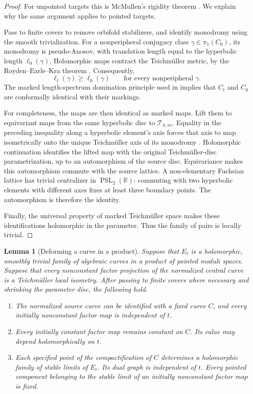 \documentclass[11pt]{article}
\newcommand{\T}{\mathcal T}
\newtheorem{lemma}[theorem]{Lemma}
\theoremstyle{remark}
\begin{document}
\begin{proof}
For unpointed targets this is McMullen's rigidity theorem
\cite[Theorem~1]{McM}. We explain why the same argument applies
to pointed targets.

Pass to finite covers to remove orbifold stabilizers, and
identify monodromy using the smooth trivialization. For a
nonperipheral conjugacy class \(\gamma\in\pi_1(C_0)\), its
monodromy is pseudo-Anosov, with translation length equal to
the hyperbolic length \(\ell_0(\gamma)\). Holomorphic maps
contract the Teichm\"uller metric, by the
Royden--Earle--Kra theorem \cite{Royden,EK}. Consequently,
\[
\ell_t(\gamma)\geq \ell_0(\gamma)
\qquad\text{for every nonperipheral }\gamma.
\]
The marked length-spectrum domination principle used in
\cite[proof of Theorem~1, fact~(1)]{McM} implies that \(C_t\)
and \(C_0\) are conformally identical with their markings.

For completeness, the maps are then identical as marked maps.
Lift them to equivariant maps from the same hyperbolic disc to
\(\T_{h,m}\). Equality in the preceding inequality along a
hyperbolic element's axis forces that axis to map isometrically
onto the unique Teichm\"uller axis of its monodromy
\cite{Bers}. Holomorphic continuation identifies the lifted map
with the original Teichm\"uller-disc parametrization, up to an
automorphism of the source disc. Equivariance makes this
automorphism commute with the source lattice. A non-elementary
Fuchsian lattice has trivial centralizer in
\(\operatorname{PSL}_2(\mathbb R)\): commuting with two
hyperbolic elements with different axes fixes at least three
boundary points. The automorphism is therefore the identity.

Finally, the universal property of marked Teichm\"uller space
makes these identifications holomorphic in the parameter.
Thus the family of pairs is locally trivial.
\end{proof}


\begin{lemma}[Deforming a curve in a product]\label{lem:curve}
Suppose that \(E_t\) is a holomorphic, smoothly trivial family
of algebraic curves in a product of pointed moduli spaces.
Suppose that every nonconstant factor projection of the
normalized central curve is a Teichm\"uller local isometry.
After passing to finite covers where necessary and shrinking
the parameter disc, the following hold.
\begin{enumerate}
\item
The normalized source curve can be identified with a fixed curve
\(C\), and every initially nonconstant factor map is independent
of \(t\).

\item
Every initially constant factor map remains constant on \(C\).
Its value may depend holomorphically on \(t\).

\item
Each specified point of the compactification of \(C\) determines
a holomorphic family of stable limits of \(E_t\). Its dual graph
is independent of \(t\). Every pointed component belonging to
the stable limit of an initially nonconstant factor map is fixed.
\end{enumerate}
\end{lemma}
\end{document}
